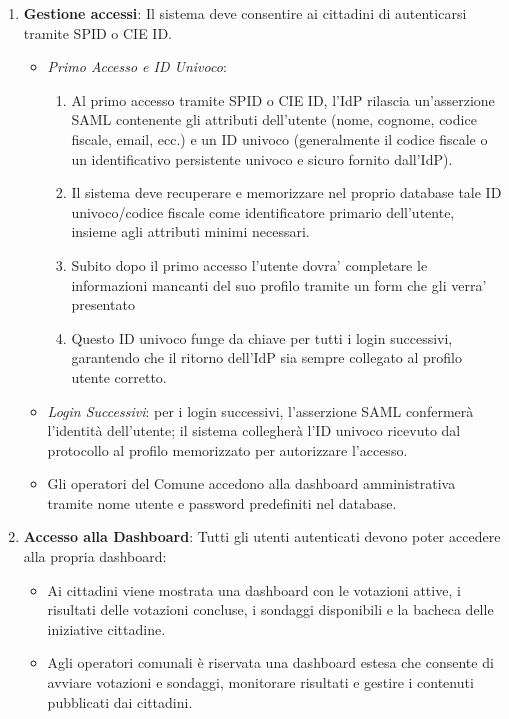 \documentclass{article}
\begin{document}
\begin{enumerate}[label=\textbf{RF\arabic*}]
	\item \textbf{Gestione accessi}: Il sistema deve consentire ai cittadini di autenticarsi tramite SPID o CIE ID.
	\begin{itemize}
		\item \textit{Primo Accesso e ID Univoco}:
		\begin{enumerate}[label=\arabic*.]
			\item Al primo accesso tramite SPID o CIE ID, l’IdP rilascia un’asserzione SAML contenente gli attributi dell’utente (nome, cognome, codice fiscale, email, ecc.) e un ID univoco (generalmente il codice fiscale o un identificativo persistente univoco e sicuro fornito dall’IdP).
			\item Il sistema deve recuperare e memorizzare nel proprio database tale ID univoco/codice fiscale come identificatore primario dell’utente, insieme agli attributi minimi necessari.
			\item Subito dopo il primo accesso l'utente dovra' completare le informazioni mancanti del suo profilo tramite un form che gli verra' presentato
			\item Questo ID univoco funge da chiave per tutti i login successivi, garantendo che il ritorno dell’IdP sia sempre collegato al profilo utente corretto.
		\end{enumerate}
		\item \textit{Login Successivi}: per i login successivi, l’asserzione SAML confermerà l’identità dell’utente; il sistema collegherà l’ID univoco ricevuto dal protocollo al profilo memorizzato per autorizzare l’accesso.
		\item Gli operatori del Comune accedono alla dashboard amministrativa tramite nome utente e password predefiniti nel database.
	\end{itemize}

	\item \textbf{Accesso alla Dashboard}: Tutti gli utenti autenticati devono poter accedere alla propria dashboard:
	\begin{itemize}
		\item Ai cittadini viene mostrata una dashboard con le votazioni attive, i risultati delle votazioni concluse, i sondaggi disponibili e la bacheca delle iniziative cittadine.
		\item Agli operatori comunali è riservata una dashboard estesa che consente di avviare votazioni e sondaggi, monitorare risultati e gestire i contenuti pubblicati dai cittadini.
	\end{itemize}


\end{enumerate}
\end{document}
